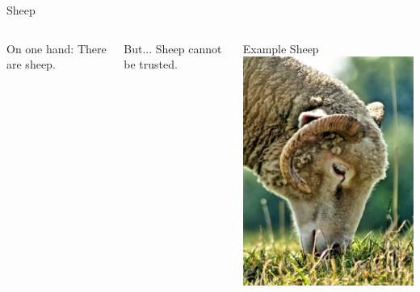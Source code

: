 \documentclass{beamer}
\begin{document}
\begin{frame}{Sheep}
\begin{columns}
 \begin{block}{On one hand:}
 There are sheep.
 \end{block}
 \begin{block}{But...}
 Sheep cannot be trusted.
 \end{block}
\end{columns}
\end{frame}
\end{document}
